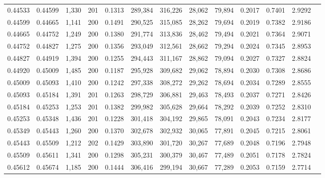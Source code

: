\begin{tabular}{rrrrrrrrrrrrr}
0.44533 & 0.44599 & 1,330 & 201 &                                     0.1313 & 289,384 & 316,226 &  28,062 &  79,894 & 0.2017 & 0.7401 & 2.9292 \\
0.44599 & 0.44665 & 1,141 & 200 &                                     0.1491 & 290,525 & 315,085 &  28,262 &  79,694 & 0.2019 & 0.7382 & 2.9186 \\
0.44665 & 0.44752 & 1,249 & 200 &                                     0.1380 & 291,774 & 313,836 &  28,462 &  79,494 & 0.2021 & 0.7364 & 2.9071 \\
0.44752 & 0.44827 & 1,275 & 200 &                                     0.1356 & 293,049 & 312,561 &  28,662 &  79,294 & 0.2024 & 0.7345 & 2.8953 \\
0.44827 & 0.44919 & 1,394 & 200 &                                     0.1255 & 294,443 & 311,167 &  28,862 &  79,094 & 0.2027 & 0.7327 & 2.8824 \\
0.44920 & 0.45009 & 1,485 & 200 &                                     0.1187 & 295,928 & 309,682 &  29,062 &  78,894 & 0.2030 & 0.7308 & 2.8686 \\
0.45009 & 0.45093 & 1,410 & 200 &                                     0.1242 & 297,338 & 308,272 &  29,262 &  78,694 & 0.2034 & 0.7289 & 2.8555 \\
0.45093 & 0.45184 & 1,391 & 201 &                                     0.1263 & 298,729 & 306,881 &  29,463 &  78,493 & 0.2037 & 0.7271 & 2.8426 \\
0.45184 & 0.45253 & 1,253 & 201 &                                     0.1382 & 299,982 & 305,628 &  29,664 &  78,292 & 0.2039 & 0.7252 & 2.8310 \\
0.45253 & 0.45348 & 1,436 & 201 &                                     0.1228 & 301,418 & 304,192 &  29,865 &  78,091 & 0.2043 & 0.7234 & 2.8177 \\
0.45349 & 0.45443 & 1,260 & 200 &                                     0.1370 & 302,678 & 302,932 &  30,065 &  77,891 & 0.2045 & 0.7215 & 2.8061 \\
0.45443 & 0.45509 & 1,212 & 202 &                                     0.1429 & 303,890 & 301,720 &  30,267 &  77,689 & 0.2048 & 0.7196 & 2.7948 \\
0.45509 & 0.45611 & 1,341 & 200 &                                     0.1298 & 305,231 & 300,379 &  30,467 &  77,489 & 0.2051 & 0.7178 & 2.7824 \\
0.45612 & 0.45674 & 1,185 & 200 &                                     0.1444 & 306,416 & 299,194 &  30,667 &  77,289 & 0.2053 & 0.7159 & 2.7714 \\

\end{tabular}

